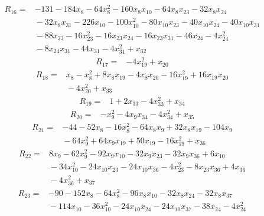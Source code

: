 {%
\begin{align*}
R_{16} ={}& -131 - 184x_{8} - 64x_{8}^{2} - 160x_{8} x_{10} - 64x_{8} x_{23} - 32x_{8} x_{24} \\
&{}  - 32x_{8} x_{31} - 226x_{10} - 100x_{10}^{2} - 80x_{10} x_{23} - 40x_{10} x_{24} - 40x_{10} x_{31} \\
&{}  - 88x_{23} - 16x_{23}^{2} - 16x_{23} x_{24} - 16x_{23} x_{31} - 46x_{24} - 4x_{24}^{2} \\
&{}  - 8x_{24} x_{31} - 44x_{31} - 4x_{31}^{2} + x_{32}
\end{align*}
\begin{align*}
R_{17} ={}& -4x_{19}^{2} + x_{20}
\end{align*}
\begin{align*}
R_{18} ={}& x_{8} - x_{8}^{2} + 8x_{8} x_{19} - 4x_{8} x_{20} - 16x_{19}^{2} + 16x_{19} x_{20} \\
&{}  - 4x_{20}^{2} + x_{33}
\end{align*}
\begin{align*}
R_{19} ={}& 1 + 2x_{33} - 4x_{33}^{2} + x_{34}
\end{align*}
\begin{align*}
R_{20} ={}& -x_{9}^{2} - 4x_{9} x_{34} - 4x_{34}^{2} + x_{35}
\end{align*}
\begin{align*}
R_{21} ={}& -44 - 52x_{8} - 16x_{8}^{2} - 64x_{8} x_{9} + 32x_{8} x_{19} - 104x_{9} \\
&{}  - 64x_{9}^{2} + 64x_{9} x_{19} + 50x_{19} - 16x_{19}^{2} + x_{36}
\end{align*}
\begin{align*}
R_{22} ={}& 8x_{9} - 62x_{9}^{2} - 92x_{9} x_{10} - 32x_{9} x_{23} - 32x_{9} x_{36} + 6x_{10} \\
&{}  - 34x_{10}^{2} - 24x_{10} x_{23} - 24x_{10} x_{36} - 4x_{23}^{2} - 8x_{23} x_{36} + 4x_{36} \\
&{}  - 4x_{36}^{2} + x_{37}
\end{align*}
\begin{align*}
R_{23} ={}& -90 - 152x_{8} - 64x_{8}^{2} - 96x_{8} x_{10} - 32x_{8} x_{24} - 32x_{8} x_{37} \\
&{}  - 114x_{10} - 36x_{10}^{2} - 24x_{10} x_{24} - 24x_{10} x_{37} - 38x_{24} - 4x_{24}^{2} \\

\end{align*}}
